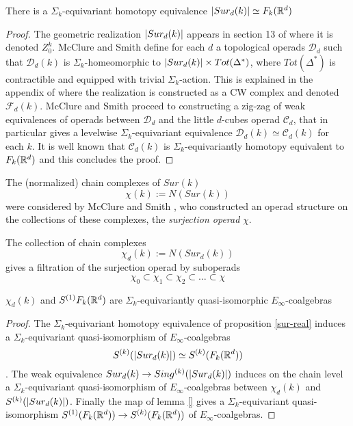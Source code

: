 
\begin{proposition} \label{sur-real}
	There is a $\Sigma_k$-equivariant homotopy equivalence
	$\lvert Sur_d(k)\rvert \simeq F_k(\mathbb{R}^d)$
\end{proposition}

\begin{proof}
	The geometric realization $\lvert Sur_d(k)\rvert$ appears in section 13 of \cite{MS} where it is denoted $Z_0^k$.
	McClure and Smith define for each $d$ a topological operads $\mathcal{D}_d$ such that $\mathcal{D}_d(k)$ is $\Sigma_k$-homeomorphic to $\lvert Sur_d(k)\rvert \times Tot(\Delta^*)$, where $Tot(\Delta^*)$ is contractible and equipped with trivial $\Sigma_k$-action.
	This is explained in the appendix of \cite{cyclic} where the realization is constructed as a CW complex and denoted $\mathcal{F}_d(k)$.
	McClure and Smith proceed to constructing a zig-zag of weak equivalences of operads between $\mathcal{D}_d$ and the little $d$-cubes operad
	$\mathcal{C}_d$, that in particular gives a levelwise $\Sigma_k$-equivariant equivalence $\mathcal{D}_d(k) \simeq \mathcal{C}_d(k)$ for each $k$. It is well known that $\mathcal{C}_d(k)$ is $\Sigma_k$-equivariantly homotopy equivalent to $F_k(\mathbb{R}^d)$ and this concludes the proof.
\end{proof}

The (normalized) chain complexes of $Sur(k)$ $$\chi(k):=N(Sur(k))$$
were considered by McClure and Smith \cite{MS}, %
who constructed an operad structure on the collections of these complexes, the {\it surjection operad} $\chi$.

The collection of chain complexes
$$\chi_d(k):=N(Sur_d(k))$$
gives a filtration of the surjection operad by suboperads
$$\chi_0 \subset \chi_1 \subset \chi_2 \subset \dots \subset \chi$$

\begin{proposition} \label{sur-model}
	$\chi_d(k)$ and $S^{(1)}{F_k(\mathbb{R}^d)}$ are $\Sigma_k$-equivariantly quasi-isomorphic $E_\infty$-coalgebras
\end{proposition}

\begin{proof}
	The $\Sigma_k$-equivariant homotopy equivalence of proposition \ref{sur-real} induces a $\Sigma_k$-equivariant quasi-isomorphism of $E_{\infty}$-coalgebras
	$$S^{(k)}(\lvert Sur_d(k)\rvert) \simeq S^{(k)}(F_k(\mathbb{R}^d))$$.
	The weak equivalence %
	$Sur_d(k) \to Sing^{(k)}(\lvert Sur_d(k)\rvert)$ induces on the chain level a $\Sigma_k$-equivariant quasi-isomorphism of
	$E_\infty$-coalgebras
	between $\chi_d(k)$
	and $S^{(k)}(\lvert Sur_d(k)\rvert)$.
	Finally the map of lemma \ref{} gives a $\Sigma_k$-equivariant quasi-isomorphism $S^{(1)}(F_k(\mathbb{R}^d)) \to S^{(k)}(F_k(\mathbb{R}^d))$ of $E_\infty$-coalgebras.
\end{proof}

